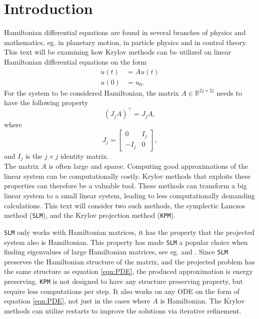 \chapter{Introduction} %
Hamiltonian differential equations are found in several branches of physics and mathematics, eg. in planetary motion, in particle physics and in control theory. This text will be examining how Krylov methods can be utilized on linear Hamiltonian differential equations on the form 
\begin{equation} 
\begin{aligned}
\dot{u}(t) &= A u(t)\\
u(0)&= u_0.
\end{aligned}
\label{eqn:PDE}
\end{equation} 
For the system to be considered Hamiltonian, the matrix $A \in \mathbb{R}^{2j \times 2j}$ needs to have the following property  \cite{Hamiltonian}
\begin{equation*}
(J_jA)^{\top} = J_j A,
\end{equation*}
where
\begin{equation*}
J_j = 
\begin{bmatrix}
0&I_j\\-I_j&0
\end{bmatrix},
\end{equation*}
and $I_j$ is the $j \times j$ identity matrix. \\

\noindent The matrix $A$ is often large and sparse. Computing good approximations of the linear system can be computationally costly. Krylov methods that exploits these properties can therefore be a valuable tool. These methods can transform a big linear system to a small linear system, leading to less computationally demanding calculations. This text will consider two such methods, the symplectic Lanczos method (\texttt{SLM}), and the Krylov projection method (\texttt{KPM}). 

\noindent \texttt{SLM} only works with Hamiltonian matrices, it has the property that the projected system also is Hamiltonian.
This property has made \texttt{SLM} a popular choice when finding eigenvalues of large Hamiltonian matrices, see eg. \cite{SLM1} and \cite{SLM2}. Since \texttt{SLM} preserves the Hamiltonian structure of the matrix, and the projected problem has the same structure as equation \eqref{eqn:PDE}, the produced approximation is energy preserving. \texttt{KPM} is not designed to have any structure preserving property, but require less computations per step. It also works on any ODE on the form of equation \eqref{eqn:PDE}, not just in the cases where $A$ is Hamiltonian. 
The Krylov methods can utilize restarts to improve the solutions via iterative refinement.\\

